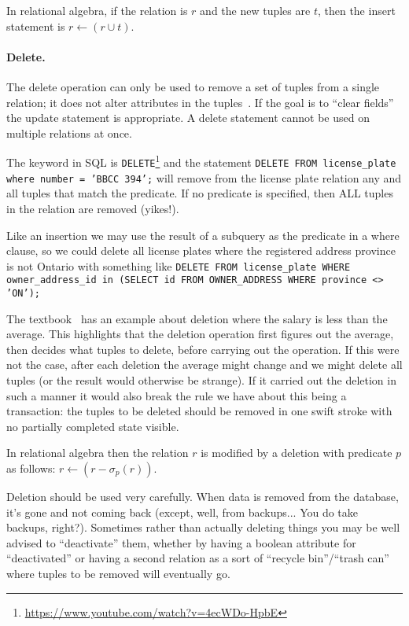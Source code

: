 In relational algebra, if the relation is $r$ and the new tuples are $t$, then the insert statement is $r \leftarrow (r \cup t)$.

\paragraph{Delete.}

The delete operation can only be used to remove a set of tuples from a single relation; it does not alter attributes in the tuples~\cite{dsc}. If the goal is to ``clear fields'' the update statement is appropriate. A delete statement cannot be used on multiple relations at once.

The keyword in SQL is \texttt{DELETE}\footnote{\url{https://www.youtube.com/watch?v=4ecWDo-HpbE}} and the statement \texttt{DELETE FROM license\_plate where number = 'BBCC 394';} will remove from the license plate relation any and all tuples that match the predicate. If no predicate is specified, then ALL tuples in the relation are removed (yikes!).

Like an insertion we may use the result of a subquery as the predicate in a where clause, so we could delete all license plates where the registered address province is not Ontario with something like \texttt{DELETE FROM license\_plate WHERE owner\_address\_id in (SELECT id FROM OWNER\_ADDRESS WHERE province <> 'ON');}

The textbook~\cite{dsc} has an example about deletion where the salary is less than the average. This highlights that the deletion operation first figures out the average, then decides what tuples to delete, before carrying out the operation. If this were not the case, after each deletion the average might change and we might delete all tuples (or the result would otherwise be strange). If it carried out the deletion in such a manner it would also break the rule we have about this being a transaction: the tuples to be deleted should be removed in one swift stroke with no partially completed state visible.

In relational algebra then the relation $r$ is modified by a deletion with predicate $p$ as follows: $r \leftarrow (r - \sigma_{p}( r ) )$.

Deletion should be used very carefully. When data is removed from the database, it's gone and not coming back (except, well, from backups... You do take backups, right?). Sometimes rather than actually deleting things you may be well advised to ``deactivate'' them, whether by having a boolean attribute for ``deactivated'' or having a second relation as a sort of ``recycle bin''/``trash can'' where tuples to be removed will eventually go.


